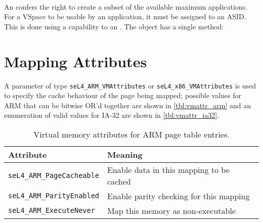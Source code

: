 \paragraph{}

An  confers the right to create a subset of the available
maximum applications. For a VSpace to be usable by an application, it
must be assigned to an ASID. This is done using a capability to an
. The  object has a single method:
\vspace{2ex}\\

\section{Mapping Attributes}
A parameter of type \texttt{seL4\_ARM\_VMAttributes} or
\texttt{seL4\_x86\_VMAttributes} is used to specify the cache behaviour of the
page being mapped; possible values for ARM that can be bitwise OR'd together are
shown in \autoref{tbl:vmattr_arm} \ifxeightsix and an enumeration of valid values
for IA-32 are shown in \autoref{tbl:vmattr_ia32}\fi.

\begin{table}[htb]
  \begin{center}
    \begin{tabularx}{\textwidth}{p{}X}
      \toprule
      Attribute & Meaning \\
      \midrule
      \texttt{seL4\_ARM\_PageCacheable} & Enable data in this mapping
      to be cached \\
      \texttt{seL4\_ARM\_ParityEnabled} & Enable parity checking for
      this mapping\\
      \texttt{seL4\_ARM\_ExecuteNever} & Map this memory as non-executable \\
      \bottomrule
    \end{tabularx}
    \caption{\label{tbl:vmattr_arm} Virtual memory attributes for ARM page
      table entries.}
  \end{center}
\end{table}

